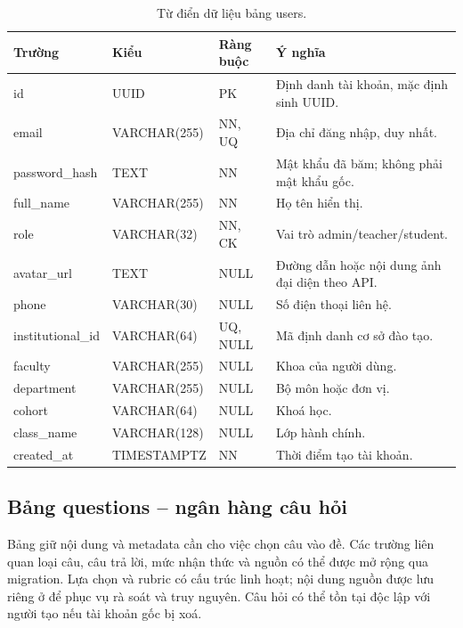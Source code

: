 \begin{table}[H]
\centering
\caption{Từ điển dữ liệu bảng users.}
\label{tab:dict-users}
\begin{tabularx}{\textwidth}{>{\ttfamily\color{daumaroon}}p{}p{}p{}X}
\toprule
\rowcolor{gray100}Trường & Kiểu & Ràng buộc & Ý nghĩa \\
\midrule
id & UUID & PK & Định danh tài khoản, mặc định sinh UUID. \\
email & VARCHAR(255) & NN, UQ & Địa chỉ đăng nhập, duy nhất. \\
password\_hash & TEXT & NN & Mật khẩu đã băm; không phải mật khẩu gốc. \\
full\_name & VARCHAR(255) & NN & Họ tên hiển thị. \\
role & VARCHAR(32) & NN, CK & Vai trò admin/teacher/student. \\
avatar\_url & TEXT & NULL & Đường dẫn hoặc nội dung ảnh đại diện theo API. \\
phone & VARCHAR(30) & NULL & Số điện thoại liên hệ. \\
institutional\_id & VARCHAR(64) & UQ, NULL & Mã định danh cơ sở đào tạo. \\
faculty & VARCHAR(255) & NULL & Khoa của người dùng. \\
department & VARCHAR(255) & NULL & Bộ môn hoặc đơn vị. \\
cohort & VARCHAR(64) & NULL & Khoá học. \\
class\_name & VARCHAR(128) & NULL & Lớp hành chính. \\
created\_at & TIMESTAMPTZ & NN & Thời điểm tạo tài khoản. \\
\bottomrule
\end{tabularx}
\end{table}

\subsection{Bảng questions -- ngân hàng câu hỏi}
Bảng  giữ nội dung và metadata cần cho việc chọn câu vào đề.
Các trường liên quan loại câu, câu trả lời, mức nhận thức và nguồn có thể
được mở rộng qua migration. Lựa chọn và rubric có cấu trúc linh hoạt; nội
dung nguồn được lưu riêng ở  để phục vụ rà soát và
truy nguyên. Câu hỏi có thể tồn tại độc lập với người tạo nếu tài khoản
gốc bị xoá.

